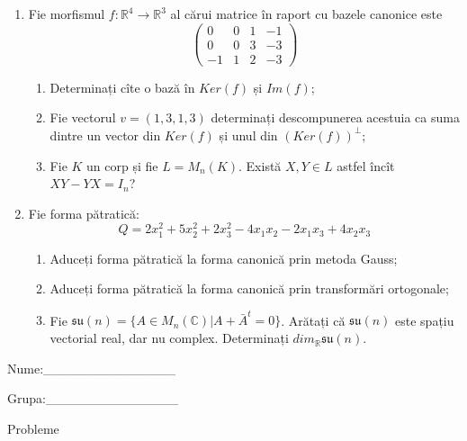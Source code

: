 \documentclass{article}
\begin{document}
\begin{enumerate}
 \item Fie morfismul $f:\mathbb{R}^4 \to \mathbb{R}^3$ al cărui matrice în raport cu bazele canonice este
$$\begin{pmatrix}
0&0&1&-1\\
0&0&3&-3\\
-1&1&2&-3
\end{pmatrix}$$

\begin{enumerate}
\item Determinați cîte o bază în $Ker(f)$ și $Im(f)$;
\item Fie vectorul $v=(1,3,1,3)$ determinați descompunerea acestuia ca suma dintre un vector din $Ker(f)$ și unul din $(Ker(f))^\perp$;
\item Fie $K$ un corp și fie $L=M_n(K)$. Există $X,Y \in L$ astfel încît $XY-YX=I_n$?  
\end{enumerate}
\item Fie forma pătratică:
$$Q= 2x_1^2+5x_2^2+2x_3^2-4x_1x_2-2x_1x_3+4x_2x_3$$

\begin{enumerate}
\item Aduceți forma pătratică la forma canonică prin metoda Gauss;
\item Aduceți forma pătratică la forma canonică prin transformări ortogonale;
\item Fie $\mathfrak{su}(n)=\{ A \in M_n(\mathbb{C}) | A+\bar{A}^t=0\}$. Arătați că $\mathfrak{su}(n)$ este spațiu vectorial real, dar nu complex.
Determinați $dim_{\mathbb{R}}\mathfrak{su}(n)$.
\end{enumerate}
\end{enumerate}
\newpage
\begin{flushright}
Nume:\_\_\_\_\_\_\_\_\_\_\_\_\_\_
 
 
Grupa:\_\_\_\_\_\_\_\_\_\_\_\_\_\_
\end{flushright}
\begin{center}
\vspace{2cm}
{\Large Probleme}
\vspace{2cm}
\end{center}
\end{document}
